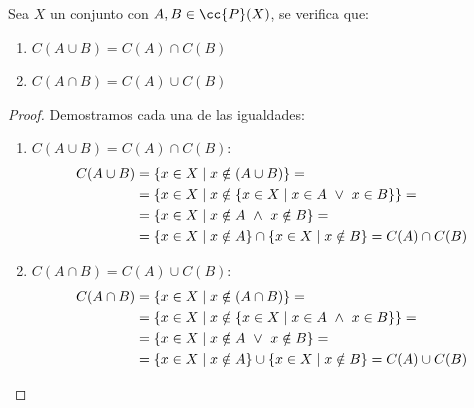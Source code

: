 \begin{prop}
    Sea $X$ un conjunto con $A, B \in \cc{P}(X)$, se verifica que:
    \begin{enumerate}
        \item $C(A \cup B) = C(A) \cap C(B)$
        \item $C(A \cap B) = C(A) \cup C(B)$
    \end{enumerate}
\end{prop}
\begin{proof} Demostramos cada una de las igualdades:
\begin{enumerate}
    \item $C(A \cup B) = C(A) \cap C(B)$:
    \begin{equation*}
        \begin{split}
            C(A \cup B) &= \{x \in X \mid x \notin (A \cup B)\} =\\
            & =\{x \in X \mid x \notin \{x \in X \mid x \in A \ \lor \  x \in B\} \} =\\
            & = \{x \in X \mid x \notin A \ \land \  x \notin B \} =\\
            & =\{x \in X \mid x \notin A\} \cap \{x \in X \mid x \notin B\} = C(A) \cap C(B)
        \end{split}
    \end{equation*}

    \item $C(A \cap B) = C(A) \cup C(B)$:
    \begin{equation*}
        \begin{split}
            C(A \cap B) &= \{x \in X \mid x \notin (A \cap B)\} =\\
            & =\{x \in X \mid x \notin \{x \in X \mid x \in A \ \land \  x \in B\} \} =\\
            & = \{x \in X \mid x \notin A \ \lor \  x \notin B \} =\\
            & =\{x \in X \mid x \notin A\} \cup \{x \in X \mid x \notin B\} = C(A) \cup C(B)
        \end{split}
    \end{equation*}
\end{enumerate}
\end{proof}

